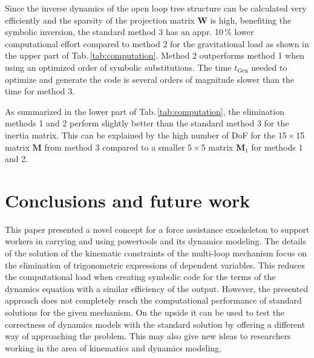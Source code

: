 \documentclass{svproc}
\newcommand{\bm}[1]{\boldsymbol{#1}}
\begin{document}
Since the inverse dynamics of the open loop tree structure can be calculated very efficiently and the sparsity of the projection matrix $\bm{W}$ is high, benefiting the symbolic inversion, the standard method 3 has an appr. 10\,\% lower computational effort compared to method 2 for the gravitational load as shown in the upper part of Tab.\,\ref{tab:computation}.
Method 2 outperforms method 1 when using an optimized order of symbolic substitutions.
The time $t_{\mathrm{Gen}}$ needed to optimize and generate the code is several orders of magnitude slower than the time for method 3.

As summarized in the lower part of Tab.\,\ref{tab:computation}, the elimination methods 1 and 2 perform slightly better than the standard method 3 for the inertia matrix.
This can be explained by the high number of DoF for the 15\,$\times$\,15 matrix $\bm{M}$ from method 3 compared to a smaller 5\,$\times$\,5 matrix $\bm{M}_1$ for methods 1 and 2.

\section{Conclusions and future work}
\label{sec:conclusion}

This paper presented a novel concept for a force assistance exoskeleton to support workers in carrying and using powertools and its dynamics modeling.
The details of the solution of the kinematic constraints of the multi-loop mechanism focus on the elimination of trigonometric expressions of dependent variables.
This reduces the computational load when creating symbolic code for the terms of the dynamics equation with a similar efficiency of the output.
However, the presented approach does not completely reach the computational performance of standard solutions for the given mechanism.
On the upside it can be used to test the correctness of dynamics models with the standard solution by offering a different way of approaching the problem.
This may also give new ideas to researchers working in the area of kinematics and dynamics modeling.
\end{document}
